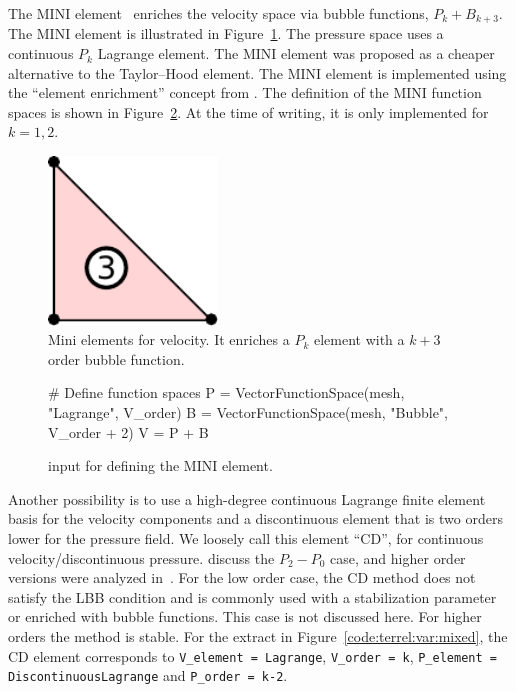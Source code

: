 The MINI element~\citep{ArnoldBrezziFortin1984} enriches the velocity
space via bubble functions, $P_k + B_{k+3}$. The MINI element is
illustrated in Figure~\ref{fig:terrel:MINIElement}.  The pressure
space uses a continuous $P_{k}$ Lagrange element.  The MINI element
was proposed as a cheaper alternative to the Taylor--Hood element. The
MINI element is implemented using the ``element enrichment'' concept
from \ufl{}. The \ufl{} definition of the MINI function spaces is shown
in Figure~\ref{code:terrel:MINI}.  At the time of writing, it is only
implemented for $k=1, 2$.
%
\begin{figure}
  \center
  \includegraphics[width=0.4\textwidth]{chapters/terrel/pdf/MINI.pdf}
  \caption{Mini elements for velocity.  It enriches a $P_k$ element with
  a $k+3$ order bubble function.}
  \label{fig:terrel:MINIElement}
\end{figure}
%
\begin{figure}
\begin{python}
# Define function spaces
P = VectorFunctionSpace(mesh, "Lagrange", V_order)
B = VectorFunctionSpace(mesh, "Bubble", V_order + 2)
V = P + B
\end{python}
\caption{\ufl{} input for defining the MINI element.}
\label{code:terrel:MINI}
\end{figure}

Another possibility is to use a high-degree continuous Lagrange finite
element basis for the velocity components and a discontinuous element
that is two orders lower for the pressure field. We loosely call
this element ``CD'', for continuous velocity/discontinuous pressure.
\citet{BrezziFortin1991} discuss the $P_2-P_0$ case, and higher order
versions were analyzed in~\citet{MadayPateraRonquist1992}.  For the
low order case, the CD method does not satisfy the LBB condition
and is commonly used with a stabilization parameter or enriched with
bubble functions. This case is not discussed here. For higher orders the
method is stable.  For the extract
in Figure~\ref{code:terrel:var:mixed}, the CD element corresponds to
{\tt V\_element = Lagrange}, {\tt V\_order = k}, {\tt P\_element =
DiscontinuousLagrange} and {\tt P\_order = k-2}.

